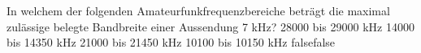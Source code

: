     {In welchem der folgenden Amateurfunkfrequenzbereiche beträgt die maximal zulässige belegte Bandbreite einer Aussendung 7 kHz?}
    {28000 bis 29000 kHz}
    {14000 bis 14350 kHz}
    {21000 bis 21450 kHz}
    {10100 bis 10150 kHz}
    {false}{false}